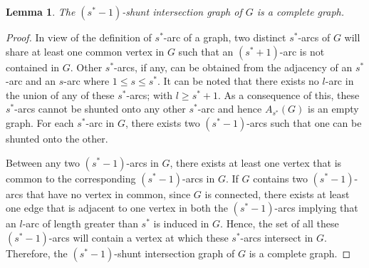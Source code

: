 \documentclass[12pt,a4paper,twoside]{article}
\newtheorem{lemma}[theorem]{Lemma}
\theoremstyle{casesty}
\theoremstyle{subcasesty}
\theoremstyle{schemesty}
\begin{document}
\begin{lemma} \label{As*}
	The $(s^{\ast}-1)$-shunt intersection graph of $G$ is a complete graph.
\end{lemma}
\begin{proof}
	In view of the definition of $s^{\ast}$-arc of a graph, two distinct $s^{\ast}$-arcs of $G$ will share at least one common vertex in $G$ such that an $(s^{\ast}+1)$-arc is not contained in $G$. Other $s^{\ast}$-arcs, if any, can be obtained from the adjacency of an $s^{\ast}$-arc and an $s$-arc where $1 \leq s \leq s^{\ast}$. It can be noted that there exists no $l$-arc in the union of any of these $s^{\ast}$-arcs; with $l \geq s^{\ast}+1$. As a consequence of this, these $s^{\ast}$-arcs cannot be shunted onto any other $s^{\ast}$-arc and hence $A_{s^{\ast}}(G)$ is an empty graph. For each $s^{\ast}$-arc in $G$, there exists two $(s^{\ast}-1)$-arcs such that one can be shunted onto the other. 
	
	Between any two $(s^{\ast}-1)$-arcs in $G$, there exists at least one vertex that is common to the corresponding $(s^{\ast}-1)$-arcs in $G$. If $G$ contains two $(s^{\ast}-1)$-arcs that have no vertex in common, since $G$ is connected, there exists at least one edge that is adjacent to one vertex in both the $(s^{\ast}-1)$-arcs implying that an $l$-arc of length greater than $s^{\ast}$ is induced in $G$. Hence, the set of all these $(s^{\ast}-1)$-arcs will contain a vertex at which these $s^{\ast}$-arcs intersect in $G$. Therefore, the $(s^{\ast}-1)$-shunt intersection graph of $G$ is a complete graph.
\end{proof}
\end{document}
